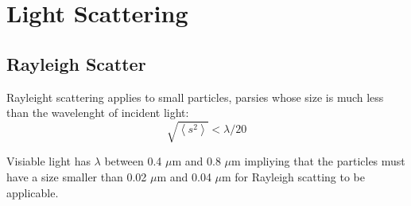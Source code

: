 \section{Light Scattering}

\subsection{Rayleigh Scatter}
Rayleight scattering applies to small particles, parsies whose size is much less than the wavelenght of incident light\cite{LightScat(3)(2)}:
\begin{equation}
\label{eq:rayleigh}
\sqrt{\left \langle s^2 \right \rangle} < \lambda / 20
\end{equation}

Visiable light has $\lambda$ between  0.4 $\mu$m and 0.8 $\mu$m impliying that the particles must have a size smaller than 0.02 $\mu$m and 0.04 $\mu$m for Rayleigh scatting to be applicable.
